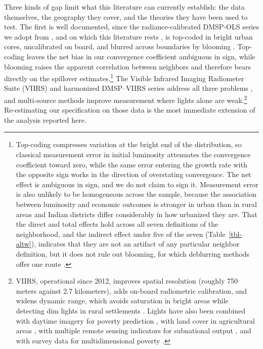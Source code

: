 \documentclass[
  a4paper, 
  twoside,
  final
]{article}
\newcounter{code}
\begin{document}
Three kinds of gap limit what this literature can currently establish:
the data themselves, the geography they cover, and the theories they
have been used to test. The first is well documented, since the
radiance-calibrated DMSP-OLS series we adopt from
\citet{chanda_kabiraj_district_convergence}, and on which this
literature rests
\citep{henderson_storeygard_weil_lights, chen_nordhaus_luminosity_gdp},
is top-coded in bright urban cores, uncalibrated on board, and blurred
across boundaries by blooming
\citep{gibson_etal_ntl_measurement, abrahams_etal_deblurring}.
Top-coding leaves the net bias in our convergence coefficient ambiguous
in sign, while blooming raises the apparent correlation between
neighbors and therefore bears directly on the spillover
estimates.\footnote{Top-coding compresses variation at the bright end of
  the distribution, so classical measurement error in initial luminosity
  attenuates the convergence coefficient toward zero, while the same
  error entering the growth rate with the opposite sign works in the
  direction of overstating convergence. The net effect is ambiguous in
  sign, and we do not claim to sign it. Measurement error is also
  unlikely to be homogeneous across the sample, because the association
  between luminosity and economic outcomes is stronger in urban than in
  rural areas and Indian districts differ considerably in how urbanized
  they are. That the direct and total effects hold across all seven
  definitions of the neighborhood, and the indirect effect under five of
  the seven (Table~\ref{tbl-altw}), indicates that they are not an
  artifact of any particular neighbor definition, but it does not rule
  out blooming, for which deblurring methods offer one route
  \citep{abrahams_etal_deblurring}.} The Visible Infrared Imaging
Radiometer Suite (VIIRS) and harmonized DMSP--VIIRS series address all
three problems
\citep{elvidge_etal_viirs, li_etal_harmonization, chiovelli_global_south},
and multi-source methods improve measurement where lights alone are
weak.\footnote{VIIRS, operational since 2012, improves spatial
  resolution (roughly 750 meters against 2.7 kilometers), adds on-board
  radiometric calibration, and widens dynamic range, which avoids
  saturation in bright areas while detecting dim lights in rural
  settlements \citep{gibson_etal_ntl_measurement}. Lights have also been
  combined with daytime imagery for poverty prediction
  \citep{jean_etal_poverty_prediction}, with land cover in agricultural
  areas \citep{keola_etal_lights_poverty}, with multiple remote sensing
  indicators for subnational output
  \citep{chen_etal_turkey_viirs, hussein_etal_vietnam_ml}, and with
  survey data for multidimensional poverty
  \citep{theara_etal_cambodia_poverty}.} Re-estimating our specification
on those data is the most immediate extension of the analysis reported
here.
\end{document}
